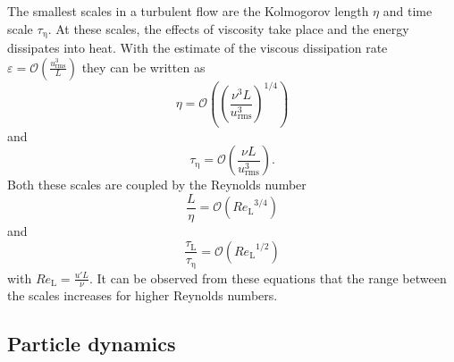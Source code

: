 \documentclass[11pt,a4paper,openany,oneside,parskip=half*]{article}
\begin{document}
\newline
The smallest scales in a turbulent flow are the Kolmogorov length $\eta$ and time scale $\tau_\mathrm{\eta}$. At these scales, the effects of viscosity take place and the energy dissipates into heat. With the estimate of the viscous dissipation rate $\varepsilon = \mathcal{O} \left(\frac{u_{\mathrm{rms}}^3}{L} \right)$ they can be written as
\begin{equation}
\eta = \mathcal{O} \left( \left(\frac{\nu^3 L}{u_\mathrm{rms}^3} \right)^{1/4}\right)
\end{equation}
and
\begin{equation}
\tau_\mathrm{\eta} = \mathcal{O} \left(\frac{\nu L}{u_\mathrm{rms}^3} \right).
\end{equation}
Both these scales are coupled by the Reynolds number
\begin{equation}
\frac{L}{\eta} = \mathcal{O} \left({Re_{\mathrm{L}}}^{3/4}\right)
\end{equation}
and
\begin{equation}
\frac{\tau_\mathrm{L}}{\tau_\mathrm{\eta}} = \mathcal{O} \left({Re_\mathrm{L}}^{1/2}\right)
\end{equation}
with $Re_\mathrm{L} = \frac{u' L}{\nu}$.
It can be observed from these equations that the range between the scales increases for higher Reynolds numbers. 
\newline
\subsection{Particle dynamics} %
\end{document}
